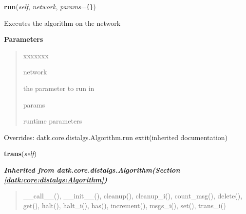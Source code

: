 \hspace{.8\funcindent}\begin{boxedminipage}{\funcwidth}

    \raggedright \textbf{run}(\textit{self}, \textit{network}, \textit{params}={\tt \texttt{\{}\texttt{\}}})

\setlength{\parskip}{2ex}
    Executes the algorithm on the network

\setlength{\parskip}{1ex}
      \textbf{Parameters}
      \vspace{-1ex}

      \begin{quote}
        \begin{Ventry}{xxxxxxx}

          \item[network]

          the parameter to run in

          \item[params]

          runtime parameters

        \end{Ventry}

      \end{quote}

      Overrides: datk.core.distalgs.Algorithm.run 	extit{(inherited documentation)}

    \end{boxedminipage}

    \label{datk:core:distalgs:Synchronous_Algorithm:trans}

    \vspace{0.5ex}

\hspace{.8\funcindent}\begin{boxedminipage}{\funcwidth}

    \raggedright \textbf{trans}(\textit{self})

\setlength{\parskip}{2ex}
\setlength{\parskip}{1ex}
    \end{boxedminipage}


\large{\textbf{\textit{Inherited from datk.core.distalgs.Algorithm\textit{(Section \ref{datk:core:distalgs:Algorithm})}}}}

\begin{quote}
\_\_call\_\_(), \_\_init\_\_(), cleanup(), cleanup\_i(), count\_msg(), delete(), get(), halt(), halt\_i(), has(), increment(), msgs\_i(), set(), trans\_i()
\end{quote}

